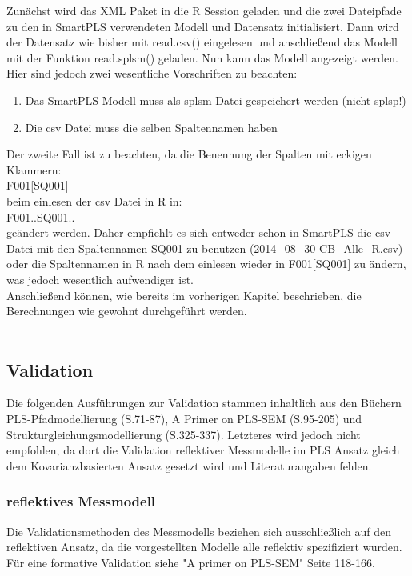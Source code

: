 \documentclass{article}\usepackage[]{graphicx}\usepackage[]{color}
\begin{document}
Zunächst wird das XML Paket in die R Session geladen und die zwei Dateipfade zu den in SmartPLS verwendeten Modell und Datensatz initialisiert. Dann wird der Datensatz wie bisher mit read.csv() eingelesen und anschließend das Modell mit der Funktion read.splsm() geladen. Nun kann das Modell angezeigt werden.\\
Hier sind jedoch zwei wesentliche Vorschriften zu beachten:
\begin{enumerate}
    \item Das SmartPLS Modell muss als splsm Datei gespeichert werden (nicht splsp!)
    \item Die csv Datei muss die selben Spaltennamen haben
\end{enumerate}
Der zweite Fall ist zu beachten, da die Benennung der Spalten mit eckigen Klammern: \\
F001[SQ001]\\
beim einlesen der csv Datei in R in:\\
F001..SQ001..\\
geändert werden. Daher empfiehlt es sich entweder schon in SmartPLS die csv Datei mit den Spaltennamen
SQ001 zu benutzen (2014\_08\_30-CB\_Alle\_R.csv) oder die Spaltennamen in R nach dem einlesen wieder in F001[SQ001] zu ändern, was jedoch wesentlich aufwendiger ist.\\
Anschließend können, wie bereits im vorherigen Kapitel beschrieben, die Berechnungen wie gewohnt durchgeführt werden.\\
\\


\subsection{Validation}
Die folgenden Ausführungen zur Validation stammen inhaltlich aus den Büchern PLS-Pfadmodellierung (S.71-87)\cite{bliemel2005handbuch}, A Primer on PLS-SEM (S.95-205)\cite{hair2013primer} und Strukturgleichungsmodellierung (S.325-337).\cite{weiber2010strukturgleichungsmodellierung} Letzteres wird jedoch nicht empfohlen, da dort die Validation reflektiver Messmodelle im PLS Ansatz gleich dem Kovarianzbasierten Ansatz gesetzt wird und Literaturangaben fehlen.
\subsubsection{reflektives Messmodell}
Die Validationsmethoden des Messmodells beziehen sich ausschließlich auf den reflektiven Ansatz, da die vorgestellten Modelle alle reflektiv spezifiziert wurden. Für eine formative Validation siehe "A primer on PLS-SEM"\cite{hair2013primer} Seite 118-166.\\
\end{document}
